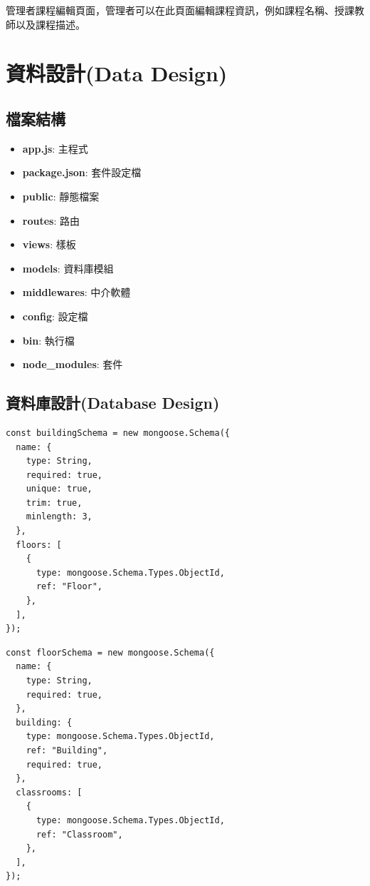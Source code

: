 \documentclass{article}
\begin{document}
管理者課程編輯頁面，管理者可以在此頁面編輯課程資訊，例如課程名稱、授課教師以及課程描述。

\newpage

\section[資料設計(DATA DESIGN)]{資料設計(Data Design)}

\subsection{檔案結構}

\begin{itemize}
	\item \textbf{app.js}: 主程式
	\item \textbf{package.json}: 套件設定檔
	\item \textbf{public}: 靜態檔案
	\item \textbf{routes}: 路由
	\item \textbf{views}: 樣板
	\item \textbf{models}: 資料庫模組
	\item \textbf{middlewares}: 中介軟體
	\item \textbf{config}: 設定檔
	\item \textbf{bin}: 執行檔
	\item \textbf{node\_modules}: 套件
\end{itemize}

\pagebreak

\subsection{資料庫設計(Database Design)}

\begin{center}
	\begin{verbatim}
const buildingSchema = new mongoose.Schema({
  name: {
    type: String,
    required: true,
    unique: true,
    trim: true,
    minlength: 3,
  },
  floors: [
    {
      type: mongoose.Schema.Types.ObjectId,
      ref: "Floor",
    },
  ],
});
\end{verbatim}
\end{center}

\begin{center}
	\begin{verbatim}
const floorSchema = new mongoose.Schema({
  name: {
    type: String,
    required: true,
  },
  building: {
    type: mongoose.Schema.Types.ObjectId,
    ref: "Building",
    required: true,
  },
  classrooms: [
    {
      type: mongoose.Schema.Types.ObjectId,
      ref: "Classroom",
    },
  ],
});
\end{verbatim}
\end{center}
\end{document}
